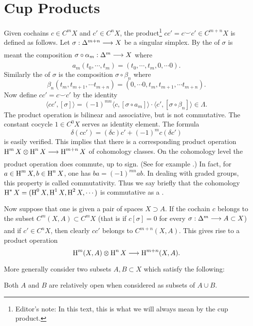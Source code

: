 \documentclass[../main]{subfiles}
\begin{document}
\section{Cup Products}\label{sec:A.4}
Given cochains $c \in C^m X$ and $c' \in C^n X$, the product\footnote{Editor's note: In this text, this is what we will always mean by the cup product.} $cc' = c \smile c' \in C^{m+n}X$ is defined as follows. Let $\sigma : \Delta^{m+n} \varrightarrow{} X$ be a singular simplex. By the  of $\sigma$ is meant the composition $\sigma \circ \alpha_m : \Delta^m \varrightarrow{} X$ where \[a_m(t_0, \cdots , t_m) = (t_0, \cdots , t_m, 0, \cdots 0).\] Similarly the  of $\sigma$ is the composition $\sigma \circ \beta_n$ where \[\beta_n (t_m, t_{m+1}, \cdots t_{m+n}) = (0, \cdots 0, t_m, t_{m+1}, \cdots t_{m+n}).\] Now define $cc'=c \smile c'$ by the identity \[\langle cc', [\sigma]\rangle = (-1)^{mn} \langle c, [\sigma\circ a_m]\rangle \cdot \langle c', [\sigma \circ \beta_n] \rangle \in \Lambda \text{.}\] The product operation is bilinear and associative, but is not commutative. The constant cocycle $1\in C^0 X$ serves as identity element. The formula \[\delta (cc')=(\delta c)c'+(-1)^m c(\delta c')\] is easily verified. This implies that there is a corresponding product operation $\homology^m X \otimes \homology^n X \varrightarrow{} \homology^{m+n}X$ of cohomology classes. On the cohomology level the product operation does commute, up to sign. (See for example \cite[p. 252]{spanier1981}.) In fact, for $a\in \operatorname{H}^m X, b\in \operatorname{H}^n X$, one has $ba = (-1)^{mn} ab$. In dealing with graded groups, this property is called commutativity. Thus we say briefly that the cohomology $\operatorname{H}^* X = (\operatorname{H}^0 X, \operatorname{H}^1 X, \operatorname{H}^2 X, \cdots)$ is commutative as a .

Now suppose that one is given a pair of spaces $X \supset A$. If the cochain $c$ belongs to the subset $C^m (X, A) \subset C^m X$ (that is if $c[\sigma]=0$ for every $\sigma:\Delta^m \varrightarrow{} A \subset X$) and if $c'\in C^n X$, then clearly $cc'$ belongs to $C^{m+n} (X, A)$. This gives rise to a product operation \[\homology^m (X, A)\otimes \homology^n X \varrightarrow{} \homology^{m+n}(X, A).\] More generally consider two subsets $A, B\subset X$ which satisfy the following:

\begin{hypo} \label{hypo:A.5}
Both $A$ and $B$ are relatively open when considered as subsets of $A\cup B$.
\end{hypo} 
\end{document}
